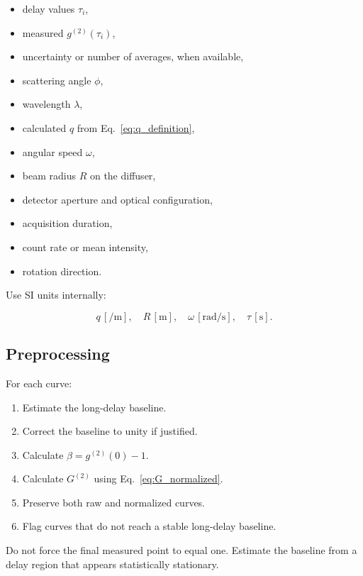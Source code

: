 \documentclass[11pt,letterpaper]{article}
\newcommand{\gtt}{g^{(2)}}
\newcommand{\Gnorm}{G^{(2)}}
\begin{document}
\begin{itemize}[leftmargin=2em]
    \item delay values $\tau_i$,
    \item measured $\gtt(\tau_i)$,
    \item uncertainty or number of averages, when available,
    \item scattering angle $\phi$,
    \item wavelength $\lambda$,
    \item calculated $q$ from Eq.~\eqref{eq:q_definition},
    \item angular speed $\omega$,
    \item beam radius $R$ on the diffuser,
    \item detector aperture and optical configuration,
    \item acquisition duration,
    \item count rate or mean intensity,
    \item rotation direction.
\end{itemize}

Use SI units internally:

\begin{equation}
    q\,[\si{\per\meter}],
    \quad
    R\,[\si{\meter}],
    \quad
    \omega\,[\si{\radian\per\second}],
    \quad
    \tau\,[\si{\second}].
\end{equation}

\subsection{Preprocessing}

For each curve:

\begin{enumerate}[leftmargin=2em]
    \item Estimate the long-delay baseline.
    \item Correct the baseline to unity if justified.
    \item Calculate $\beta=\gtt(0)-1$.
    \item Calculate $\Gnorm$ using Eq.~\eqref{eq:G_normalized}.
    \item Preserve both raw and normalized curves.
    \item Flag curves that do not reach a stable long-delay baseline.
\end{enumerate}

Do not force the final measured point to equal one. Estimate the baseline
from a delay region that appears statistically stationary.
\end{document}
